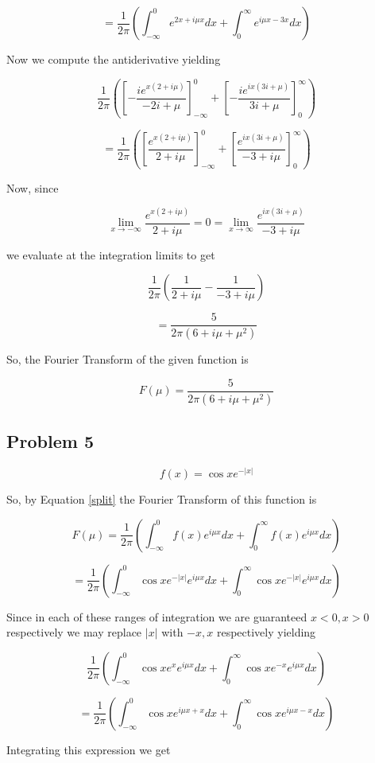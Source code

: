 \documentclass[12pt]{article}
\begin{document}
$$= \frac{1}{2\pi}\left( \int_{-\infty}^0  e^{2x+ i \mu x} dx+ \int_{0}^\infty e^{i \mu x - 3x} dx\right)$$

Now we compute the antiderivative yielding

$$ \frac{1}{2\pi}\left( \left[  -\frac{i e^{x (2+i \mu )}}{-2 i+\mu } \right]_{-\infty}^0 + \left[ -\frac{i e^{i x (3 i+\mu )}}{3 i+\mu } \right]_{0}^\infty \right)$$

$$ =\frac{1}{2\pi}\left( \left[  \frac{ e^{x (2+i \mu )}}{2 +i\mu } \right]_{-\infty}^0 + \left[ \frac{ e^{i x (3 i+\mu )}}{-3 +i\mu } \right]_{0}^\infty \right)$$


Now, since 

$$\lim_{x \to -\infty}{ \frac{ e^{x (2+i \mu )}}{2 +i\mu }}=0=\lim_{x \to \infty}{ \frac{ e^{i x (3 i+\mu )}}{-3 +i\mu }}$$

we evaluate at the integration limits to get

$$ \frac{1}{2\pi}\left(   \frac{ 1}{2 +i\mu }  - \frac{ 1}{-3 +i\mu }  \right)$$

$$=\frac{5}{2 \pi  \left(6+i \mu +\mu ^2\right)}$$

So, the Fourier Transform of the given function is

$$F(\mu)=\frac{5}{2 \pi  \left(6+i \mu +\mu ^2\right)}$$


\subsection{Problem 5}

$$f(x)=\cos{x}e^{-|x|}$$

So, by Equation \ref{split} the Fourier Transform of this function is

$$F ( \mu ) = \frac{1}{2\pi}\left( \int_{-\infty}^0 f(x) e^{i \mu x} dx+ \int_{0}^\infty f(x) e^{i \mu x} dx\right)$$

$$= \frac{1}{2\pi}\left( \int_{-\infty}^0 \cos{x}e^{-|x|} e^{i \mu x} dx+ \int_{0}^\infty \cos{x}e^{-|x|} e^{i \mu x} dx\right)$$

Since in each of these ranges of integration we are guaranteed $x<0, x>0$ respectively we may replace $|x|$ with $-x, x$ respectively yielding

$$\frac{1}{2\pi}\left( \int_{-\infty}^0 \cos{x}e^{x} e^{i \mu x} dx+ \int_{0}^\infty \cos{x}e^{-x} e^{i \mu x} dx\right)$$

$$= \frac{1}{2\pi}\left( \int_{-\infty}^0 \cos{x}e^{i \mu x+x} dx+ \int_{0}^\infty \cos{x} e^{i \mu x-x} dx\right)$$

Integrating this expression we get 
\end{document}
